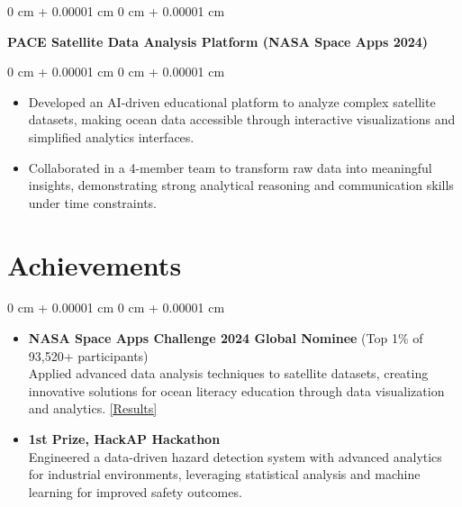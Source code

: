 \documentclass[10pt, letterpaper]{article}
\newenvironment{highlights}{ \begin{itemize}[ topsep=0.10 cm, parsep=0.10 cm, partopsep=0pt,
itemsep=0pt, leftmargin=0 cm + 10pt ] }{ \end{itemize} } %
\newenvironment{onecolentry}{ \begin{adjustwidth}{ 0 cm + 0.00001 cm }{ 0 cm + 0.00001 cm }
}{ \end{adjustwidth} } %
\begin{document}
\vspace{0.10 cm}
\begin{onecolentry}
		\textbf{PACE Satellite Data Analysis Platform (NASA Space Apps 2024)}
\end{onecolentry}
\begin{onecolentry}
	\begin{highlights}
	\vspace{0.10 cm}
		\item Developed an AI-driven educational platform to analyze complex satellite datasets, making ocean data accessible through interactive visualizations and simplified analytics interfaces. \\
		\item Collaborated in a 4-member team to transform raw data into meaningful insights, demonstrating strong analytical reasoning and communication skills under time constraints.
	\end{highlights}
\end{onecolentry}


\section{Achievements}
\begin{onecolentry}
    \begin{highlights}
        \item \textbf{NASA Space Apps Challenge 2024 Global Nominee} (Top 1\% of 93,520+ participants)
        \vspace{0.1cm}
        \\Applied advanced data analysis techniques to satellite datasets, creating innovative solutions for ocean literacy education through data visualization and analytics.
        \href{https://www.spaceappschallenge.org/nasa-space-apps-2024/find-a-team/cosmic-ninjas/}{[Results]}
        
        \item \textbf{1st Prize, HackAP Hackathon}\\\vspace{0.1cm}Engineered a data-driven hazard detection system with advanced analytics for industrial environments, leveraging statistical analysis and machine learning for improved safety outcomes.
    \end{highlights}
\end{onecolentry}
\end{document}
